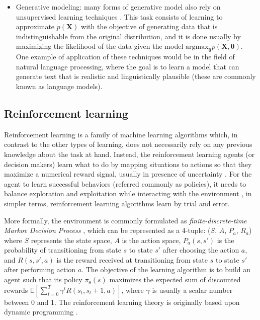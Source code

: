 \begin{itemize}
	\item Generative modeling: many forms of generative model also rely on unsupervised learning techniques \autocite{bishop2006}. This task consists of learning to approximate $p(\mathbf{X})$ with the objective of generating data that is indistinguishable from the original distribution, and it is done usually by maximizing the likelihood of the data given the model $\mathrm{argmax}_\mathbf{\theta} p(\mathbf{\mathbf{X},\mathbf{\theta}})$.  One example of application of these techniques would be in the field of natural language processing, where the goal is to learn a model that can generate text \autocite{uday2019} that is realistic and linguistically plausible (these are commonly known as language models).
\end{itemize}


\subsection{Reinforcement learning}
Reinforcement learning is a family of machine learning algorithms which, in contrast to the other types of learning, does not necessarily rely on any previous knowledge about the task at hand. Instead, the reinforcement learning agents (or decision makers) learn what to do by mapping situations to actions \autocite{sutton2018} so that they maximize a numerical reward signal, usually in presence of uncertainty \autocite{haykin1998}. For the agent to learn successful behaviors (referred commonly as policies), it needs to balance exploration and exploitation while interacting with the environment \autocite{sutton2018}, in simpler terms, reinforcement learning algorithms learn by trial and error.

More formally, the environment is commonly formulated as \textit{finite-discrete-time Markov Decision Process} \autocite{haykin1998}, which can be represented as a 4-tuple: ($S$, $A$, $P_a$, $R_a$) where $S$ represents the state space, $A$ is the action space, $P_a(s, s')$ is the probability of transitioning from state $s$ to state $s'$ after choosing the action $a$, and $R(s, s', a)$ is the reward received at transitioning from state $s$ to state $s'$ after performing action $a$. The objective of the learning algorithm is to build an agent such that its policy $\pi_\theta(s)$ maximizes the expected sum of discounted rewards $\mathbb{E} \left[ \sum_{t=0}^{T} \gamma^t R(s_t, s_t+1, a) \right]$, where $\gamma$ is usually a scalar number between 0 and 1. The reinforcement learning theory is originally based upon dynamic programming \autocite{szepesvari2010}.

